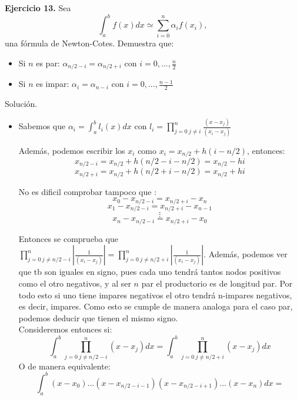 \documentclass[11pt]{article}
\begin{document}
\textbf{Ejercicio 13.} Sea $$ \int_a^b f(x) dx \simeq \sum_{i=0}^n \alpha_i f(x_i),  $$
una fórmula de Newton-Cotes. Demuestra que:

\begin{itemize}
\item Si $n$ es par: $ \alpha_{n/2-i}=\alpha_{n/2+i}$ con $ i = 0,...,\frac{n}{2}$
\item Si $n$ es impar: $ \alpha_{i}=\alpha_{n-i}$ con $ i = 0,...,\frac{n-1}{2}$
\end{itemize}

{Solución.\\}

\begin{itemize}
\item Sabemos que $\alpha_{i}=\int_a^b l_i(x) dx $ con $l_i = \prod_{j = 0  \ j\neq i}^n \frac{(x-x_j)}{(x_i-x_j)}$

Además, podemos escribir los $x_i$ como $x_i= x_{n/2} + h(i-n/2)$, entonces:   $$x_{n/2-i}  = x_{n/2} + h(n/2-i-n/2)   = x_{n/2} - hi $$ 
$$x_{n/2+i} = x_{n/2} + h(n/2+i-n/2) = x_ {n/2} + hi $$



No es dificil comprobar tampoco que :
$$  x_0 - x_{n/2-i} = x_{n/2+i}-x_n$$
$$ x_1 - x_{n/2-i} = x_{n/2+i}-x_{n-1}$$
$$\vdots$$
$$  x_n - x_{n/2-i} = x_{n/2+i}-x_0$$

Entonces se comprueba que $\prod_{j = 0  \ j\neq n/2-i}^n |\frac{1}{(x_i-x_j)}|=\prod_{j = 0  \ j\neq n/2+i}^n |\frac{1}{(x_i-x_j)}|$. Además, podemos ver que tb son iguales en signo, pues cada uno tendrá tantos nodos positivos como el otro negativos, y al ser $n$ par el productorio es de longitud par. Por todo esto si uno tiene impares negativos el otro tendrá  n-impares negativos, es decir, impares. Como esto se cumple de manera analoga para el caso par, podemos deducir que tienen el mismo signo.\\

Consideremos entonces si: $$\int_a^b  \prod_{j = 0  \ j\neq n/2-i}^n (x-x_j)  dx = \int_a^b  \prod_{j = 0  \ j\neq n/2+i}^n (x-x_j)  dx$$
O de manera equivalente:
 \begin{equation}
 \int_a^b (x-x_0)...(x-x_{n/2-i-1}) (x-x_{n/2-i+1}) ... (x-x_n)dx =
 \end{equation}


\end{itemize}
\end{document}
